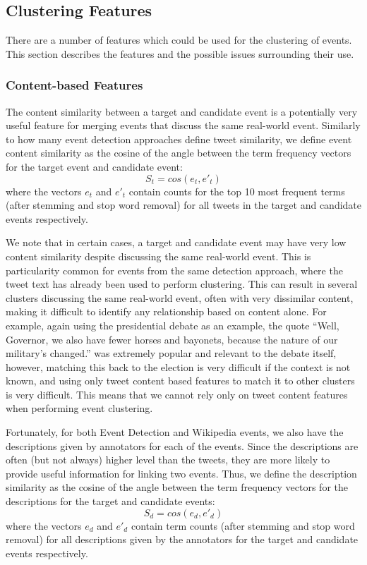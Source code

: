 
\subsection{Clustering Features}
\label{collection:clustering}
There are a number of features which could be used for the clustering of events.
This section describes the features and the possible issues surrounding their use.

\subsubsection{Content-based Features}
The content similarity between a target and candidate event is a potentially very useful feature for merging events that discuss the same real-world event.
Similarly to how many event detection approaches define tweet similarity, we define event content similarity as the cosine of the angle between the term frequency vectors for the target event and candidate event:
\begin{displaymath}
	S_t = cos(e_t, e'_t)
\end{displaymath}
where the vectors $e_t$ and $e'_t$ contain counts for the top 10 most frequent terms (after stemming and stop word removal) for all tweets in the target and candidate events respectively.

We note that in certain cases, a target and candidate event may have very low content similarity despite discussing the same real-world event.
This is particularity common for events from the same detection approach, where the tweet text has already been used to perform clustering.
This can result in several clusters discussing the same real-world event, often with very dissimilar content, making it difficult to identify any relationship based on content alone.
For example, again using the presidential debate as an example, the quote ``Well, Governor, we also have fewer horses and bayonets, because the nature of our military's changed.'' was extremely popular and relevant to the debate itself, however, matching this back to the election is very difficult if the context is not known, and using only tweet content based features to match it to other clusters is very difficult.
This means that we cannot rely only on tweet content features when performing event clustering.

Fortunately, for both Event Detection and Wikipedia events, we also have the  descriptions given by annotators for each of the events.
Since the descriptions are often (but not always) higher level than the tweets, they are more likely to provide useful information for linking two events.
Thus, we define the description similarity as the cosine of the angle between the term frequency vectors for the descriptions for the target and candidate events:
\begin{displaymath}
	S_d = cos(e_d, e'_d)
\end{displaymath}
where the vectors $e_d$ and $e'_d$ contain term counts (after stemming and stop word removal) for all descriptions given by the annotators for the target and candidate events respectively.

